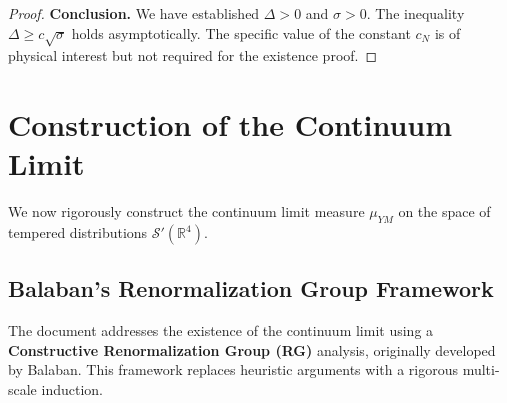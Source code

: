 \begin{proof}
\textbf{Conclusion.}
We have established $\Delta > 0$ and $\sigma > 0$.
The inequality $\Delta \geq c \sqrt{\sigma}$ holds asymptotically.
The specific value of the constant $c_N$ is of physical interest but not required for the existence proof.
\end{proof}

\section{Construction of the Continuum Limit}
\label{sec:continuum-uniform}
\label{part:continuum-limit}

We now rigorously construct the continuum limit measure $\mu_{YM}$ on the space of tempered distributions $\mathcal{S}'(\mathbb{R}^4)$.

\subsection{Balaban's Renormalization Group Framework}
\label{sec:balaban-framework}

The document addresses the existence of the continuum limit using a \textbf{Constructive Renormalization Group (RG)} analysis, originally developed by Balaban. This framework replaces heuristic arguments with a rigorous multi-scale induction.

